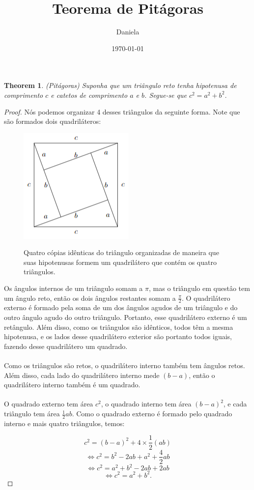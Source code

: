 \documentclass[11pt,reqno,oneside,a4paper]{article}
\title{Teorema de Pitágoras}
\author{Daniela}
\date{\today}
\newtheorem{theorem}{Theorem}
\begin{document}
\maketitle

\begin{theorem} \label{thm:Pitágoras}(Pitágoras)
	Suponha que um triângulo reto tenha hipotenusa de comprimento $c$ e catetos de comprimento $a$ e $b$. Segue-se que $c^2 = a^2 + b^2$.
\end{theorem}

\begin{proof}

Nós podemos organizar 4 desses triângulos da seguinte forma. Note que são formados dois quadriláteros:

\begin{figure}[htb]
	\centering
	\includegraphics{pit.png}
	\label{fig: Pitágoras}
	\caption{Quatro cópias idênticas do triângulo organizadas de maneira que suas hipotenusas formem um quadrilátero que contém os quatro triângulos.}
\end{figure}

Os ângulos internos de um triângulo somam a $\pi$, mas o triângulo em questâo tem um ângulo reto, então os dois ângulos restantes somam a $\frac{\pi}{2}$. O quadrilátero externo é formado pela soma de um dos ângulos agudos de um triângulo e do outro ângulo agudo do outro triângulo. Portanto, esse quadrilátero externo é um retângulo. Além disso, como os triângulos são idênticos, todos têm a mesma hipotenusa, e os lados desse quadrilátero exterior são portanto todos iguais, fazendo desse quadrilátero um quadrado.
\\ \\
Como os triângulos são retos, o quadrilátero interno também tem ângulos retos. Além disso, cada lado do quadrilátero interno mede $(b-a)$, então o quadrilátero interno também é um quadrado.
\\ \\
O quadrado externo tem área $c^2$, o quadrado interno tem área $(b -a)^2$, e cada triângulo tem área $\frac{1}{2}ab$. Como o quadrado externo é formado pelo quadrado interno e mais quatro triângulos, temos:

$$c^2 = (b - a)^2 + 4 \times \frac{1}{2}(ab)$$
$$\Leftrightarrow c^2 = b^2 - 2ab + a^2 + \frac{4}{2}ab$$
$$\Leftrightarrow c^2 = a^2 +  b^2 - 2ab + 2ab$$
$$\Leftrightarrow c^2 = a^2 + b^2.$$

\end{proof}
\end{document}
